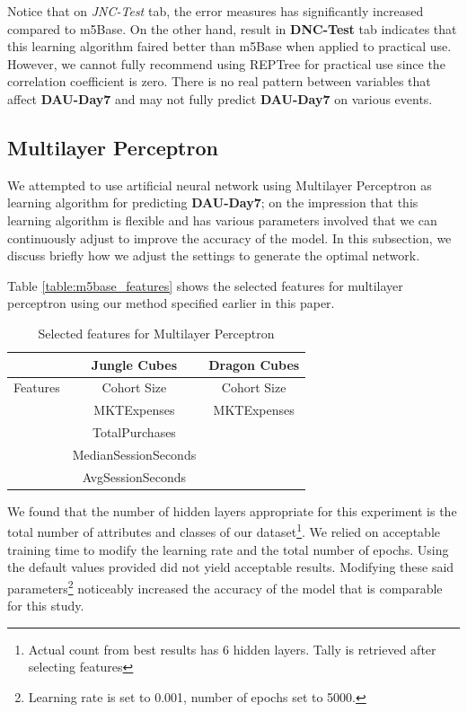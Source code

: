 Notice that on \textit{JNC-Test} tab, the error measures has significantly increased compared to m5Base. On the other hand, result in \textbf{DNC-Test} tab indicates that this learning algorithm faired better than m5Base when applied to practical use. However, we cannot fully recommend using REPTree for practical use since the correlation coefficient is zero. There is no real pattern between variables that affect \textbf{DAU-Day7} and may not fully predict \textbf{DAU-Day7} on various events.

\subsection{Multilayer Perceptron}
We attempted to use artificial neural network using Multilayer Perceptron as learning algorithm for predicting \textbf{DAU-Day7}; on the impression that this learning algorithm is flexible and has various parameters involved that we can continuously adjust to improve the accuracy of the model. In this subsection, we discuss briefly how we adjust the settings to generate the optimal network.

Table \ref{table:m5base_features} shows the selected features for multilayer perceptron using our method specified earlier in this paper.

\begin{table}[h]
\centering
\caption{Selected features for Multilayer Perceptron}
\label{table:mp_features}
\begin{tabular}{|c|c|c|}
\hline 
 & Jungle Cubes & Dragon Cubes\\ 
\hline 
Features & Cohort Size & Cohort Size 
\\& MKTExpenses & MKTExpenses 
\\& TotalPurchases &
\\& MedianSessionSeconds &
\\& AvgSessionSeconds &  
\\ 
\hline 
\end{tabular}
\end{table}

We found that the number of hidden layers appropriate for this experiment is the total number of attributes and classes of our dataset\footnote{Actual count from best results has 6 hidden layers. Tally is retrieved after selecting features}. We relied on acceptable training time to modify the learning rate and the total number of epochs. Using the default values provided did not yield acceptable results. Modifying these said parameters\footnote{Learning rate is set to 0.001, number of epochs set to 5000.} noticeably increased the accuracy of the model that is comparable for this study.

